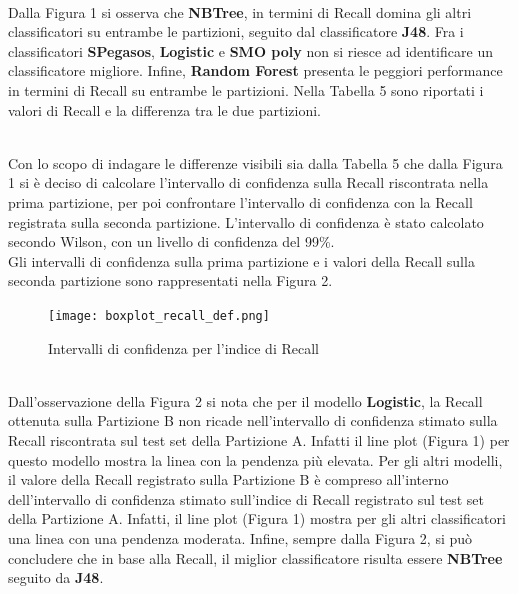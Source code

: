 \documentclass[fleqn,10pt]{SelfArx}
\begin{document}
\\
Dalla Figura 1 si osserva che \textbf{NBTree}, in termini di Recall domina gli altri classificatori su entrambe le partizioni, seguito dal classificatore \textbf{J48}. Fra i classificatori \textbf{SPegasos}, \textbf{Logistic} e \textbf{SMO poly} non si riesce ad identificare un classificatore migliore. Infine, \textbf{Random Forest} presenta le peggiori performance in termini di Recall su entrambe le partizioni.
Nella Tabella 5 sono riportati i valori di Recall e la differenza tra le due partizioni.
\begin{table}[h!]
\caption{Confronto valori di Recall}
\label{table:holdout}
\end{table}
\\
Con lo scopo di indagare le differenze visibili sia dalla Tabella 5 che dalla Figura 1 si è deciso di calcolare l'intervallo di confidenza sulla Recall riscontrata nella prima partizione, per poi confrontare l'intervallo di confidenza con la Recall registrata sulla seconda partizione. L'intervallo di confidenza è stato calcolato secondo Wilson, con un livello di confidenza del 99\%.\\
Gli intervalli di confidenza sulla prima partizione e i valori della Recall sulla seconda partizione sono rappresentati nella Figura 2.
\begin{figure}[h!]
  \texttt{[image: boxplot\_recall\_def.png]}\
  \caption{Intervalli di confidenza per l'indice di Recall}
\end{figure}
\\
Dall'osservazione della Figura 2 si nota che per il modello \textbf{Logistic}, la Recall ottenuta sulla Partizione B non ricade nell'intervallo di confidenza stimato sulla Recall riscontrata sul test set della Partizione A. Infatti il line plot (Figura 1) per questo modello mostra la linea con la pendenza più elevata. Per gli altri modelli, il valore della Recall registrato sulla Partizione B è compreso all'interno dell'intervallo di confidenza stimato sull'indice di Recall registrato sul test set della Partizione A. Infatti, il line plot (Figura 1) mostra per gli altri classificatori una linea con una pendenza moderata.  Infine, sempre dalla Figura 2, si può concludere che in base alla Recall, il miglior classificatore risulta essere \textbf{NBTree} seguito da \textbf{J48}.
\end{document}

